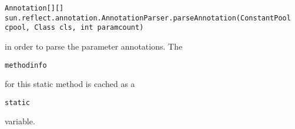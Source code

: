 \documentclass[a4paper, 10pt, titlepage]{scrartcl} %
\begin{document}
\begin{scriptsize}\verb|Annotation|\hspace{0.0pt}\verb|[|\hspace{0.0pt}\verb||\hspace{0.0pt}\verb|]|\hspace{0.0pt}\verb||\hspace{0.0pt}\verb|[|\hspace{0.0pt}\verb||\hspace{0.0pt}\verb|]|\hspace{0.0pt}\verb||\hspace{0.0pt}\verb| |\hspace{0.0pt}\verb|sun|\hspace{0.0pt}\verb|.|\hspace{0.0pt}\verb|reflect|\hspace{0.0pt}\verb|.|\hspace{0.0pt}\verb|annotation|\hspace{0.0pt}\verb|.|\hspace{0.0pt}\verb|AnnotationParser|\hspace{0.0pt}\verb|.|\hspace{0.0pt}\verb|parseAnnotation|\hspace{0.0pt}\verb|(|\hspace{0.0pt}\verb|ConstantPool|\hspace{0.0pt}\verb| |\hspace{0.0pt}\verb|cpool|\hspace{0.0pt}\verb|,|\hspace{0.0pt}\verb||\hspace{0.0pt}\verb| |\hspace{0.0pt}\verb|Class|\hspace{0.0pt}\verb| |\hspace{0.0pt}\verb|cls|\hspace{0.0pt}\verb|,|\hspace{0.0pt}\verb||\hspace{0.0pt}\verb| |\hspace{0.0pt}\verb|int|\hspace{0.0pt}\verb| |\hspace{0.0pt}\verb|paramcount|\hspace{0.0pt}\verb|)|\hspace{0.0pt}\verb||\end{scriptsize}
in order to parse the parameter annotations. The \begin{scriptsize}\verb|methodinfo|\end{scriptsize} for this static
method is cached as a \begin{scriptsize}\verb|static|\end{scriptsize} variable.
\end{document}
